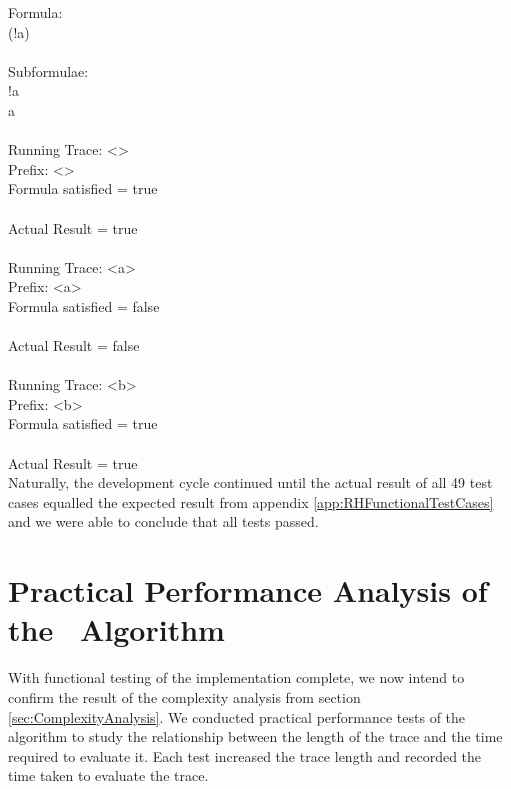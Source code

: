 \indent	Formula:\\
\indent	(!a)\\
\\
\indent	Subformulae:\\
\indent	!a\\
\indent	a\\
\\
\indent	Running Trace: \textless \textgreater\\
\indent	Prefix: \textless \textgreater\\
\indent	Formula satisfied = true\\
\\
\indent	Actual Result = true\\
\\
\indent	Running Trace: \textless a\textgreater\\
\indent	Prefix: \textless a\textgreater\\
\indent	Formula satisfied = false\\
\\
\indent	Actual Result = false\\
\\
\indent	Running Trace: \textless b\textgreater\\
\indent	Prefix: \textless b\textgreater\\
\indent	Formula satisfied = true\\
\\
\indent	Actual Result = true\\

\noindent Naturally, the development cycle continued until the actual result of all 49 test cases equalled the expected result from appendix \ref{app:RHFunctionalTestCases} and we were able to conclude that all tests passed.

\section{Practical Performance Analysis of the \RH\ Algorithm}
\label{sec:PracticalPerformanceAnalysisOfRosuHavelund}

With functional testing of the implementation complete, we now intend to confirm the result of the complexity analysis from section \ref{sec:ComplexityAnalysis}. We conducted practical performance tests of the algorithm to study the relationship between the length of the trace and the time required to evaluate it.  Each test increased the trace length and recorded the time taken to evaluate the trace.

